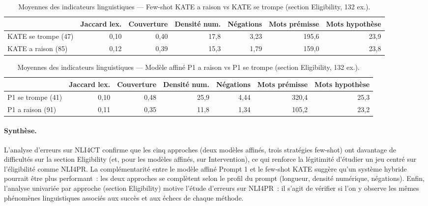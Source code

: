 \documentclass[10pt,twoside]{article}
\begin{document}
\begin{table}[htbp]
\centering
\caption{Moyennes des indicateurs linguistiques — Few-shot KATE a raison vs KATE se trompe (section Eligibility, 132 ex.).}
\label{tab:nli4ct-univarie-kate}
\scriptsize
\begin{tabular}{lrrrrrr}
\toprule
 & Jaccard lex. & Couverture & Densité num. & Négations & Mots prémisse & Mots hypothèse \\
\midrule
KATE se trompe (47) & 0,10 & 0,40 & 17,8 & 3,23 & 195,6 & 23,9 \\
KATE a raison (85) & 0,12 & 0,39 & 15,3 & 1,79 & 159,0 & 23,8 \\
\bottomrule
\end{tabular}
\end{table}

\begin{table}[htbp]
\centering
\caption{Moyennes des indicateurs linguistiques — Modèle affiné P1 a raison vs P1 se trompe (section Eligibility, 132 ex.).}
\label{tab:nli4ct-univarie-p1}
\scriptsize
\begin{tabular}{lrrrrrr}
\toprule
 & Jaccard lex. & Couverture & Densité num. & Négations & Mots prémisse & Mots hypothèse \\
\midrule
P1 se trompe (41) & 0,10 & 0,48 & 25,9 & 4,44 & 320,4 & 25,3 \\
P1 a raison (91) & 0,11 & 0,35 & 11,8 & 1,34 & 105,2 & 23,2 \\
\bottomrule
\end{tabular}
\end{table}

\paragraph{Synthèse.}
L'analyse d'erreurs sur NLI4CT confirme que les cinq approches (deux modèles affinés, trois stratégies few-shot) ont davantage de difficultés sur la section Eligibility (et, pour les modèles affinés, sur Intervention), ce qui renforce la légitimité d'étudier un jeu centré sur l'éligibilité comme NLI4PR. La complémentarité entre le modèle affiné Prompt 1 et le few-shot KATE suggère qu'un système hybride pourrait être plus performant~: les deux approches se complètent selon le profil du prompt (longueur, densité numérique, négations). Enfin, l'analyse univariée par approche (section Eligibility) motive l'étude d'erreurs sur NLI4PR~: il s'agit de vérifier si l'on y observe les mêmes phénomènes linguistiques associés aux succès et aux échecs de chaque méthode.
\end{document}
